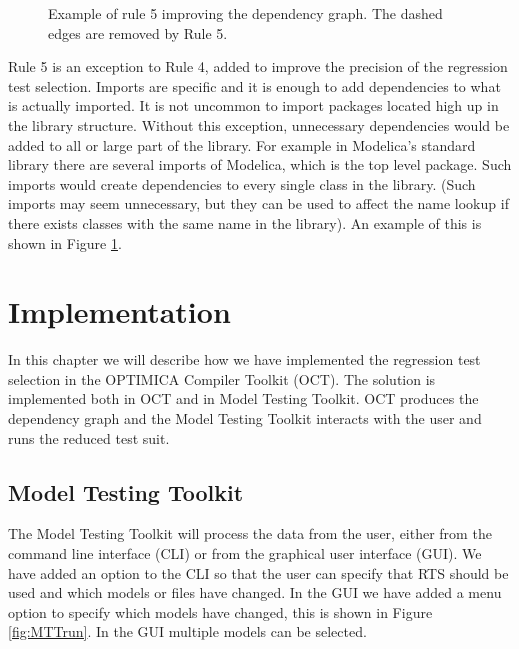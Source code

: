 \documentclass{cslthse-msc}
\begin{document}
\begin{figure}[!htbp]
    \centering
    \qquad
    \subfloat{\raisebox{4.0 cm}{}}
    \caption{Example of rule 5 improving the dependency graph. The dashed edges are removed by Rule 5.}
    \label{fig:rule5}
\end{figure}

Rule 5 is an exception to Rule 4, added to improve the precision of the regression test selection. Imports are specific and it is enough to add dependencies to what is actually imported. It is not uncommon to import packages located high up in the library structure. Without this exception, unnecessary dependencies would be added to all or large part of the library. For example in Modelica's standard library there are several imports of Modelica, which is the top level package. Such imports would create dependencies to every single class in the library. (Such imports may seem unnecessary, but they can be used to affect the name lookup if there exists classes with the same name in the library). An example of this is shown in Figure \ref{fig:rule5}.

\chapter[Implementation]{Implementation}
In this chapter we will describe how we have implemented the regression test selection in the OPTIMICA Compiler Toolkit (OCT). The solution is implemented both in OCT and in Model Testing Toolkit. OCT produces the dependency graph and the Model Testing Toolkit interacts with the user and runs the reduced test suit.

\section{Model Testing Toolkit}

The Model Testing Toolkit will process the data from the user, either from the command line interface (CLI) or from the graphical user interface (GUI). We have added an option to the CLI so that the user can specify that RTS should be used and which models or files have changed. In the GUI we have added a menu option to specify which models have changed, this is shown in Figure \ref{fig:MTTrun}. In the GUI multiple models can be selected.
\end{document}

